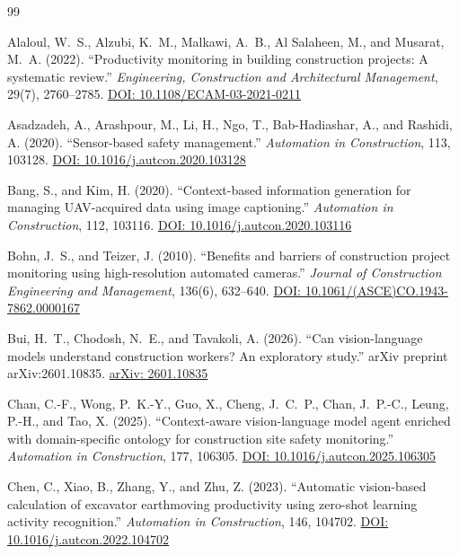 \documentclass[10pt,letterpaper]{article}
\begin{document}
\begin{thebibliography}{99}

 Alaloul, W.~S., Alzubi, K.~M., Malkawi, A.~B., Al Salaheen, M., and Musarat, M.~A. (2022). ``Productivity monitoring in building construction projects: A systematic review.'' \textit{Engineering, Construction and Architectural Management}, 29(7), 2760--2785. \href{https://doi.org/10.1108/ECAM-03-2021-0211}{DOI: 10.1108/ECAM-03-2021-0211}

 Asadzadeh, A., Arashpour, M., Li, H., Ngo, T., Bab-Hadiashar, A., and Rashidi, A. (2020). ``Sensor-based safety management.'' \textit{Automation in Construction}, 113, 103128. \href{https://doi.org/10.1016/j.autcon.2020.103128}{DOI: 10.1016/j.autcon.2020.103128}

 Bang, S., and Kim, H. (2020). ``Context-based information generation for managing UAV-acquired data using image captioning.'' \textit{Automation in Construction}, 112, 103116. \href{https://doi.org/10.1016/j.autcon.2020.103116}{DOI: 10.1016/j.autcon.2020.103116}

 Bohn, J.~S., and Teizer, J. (2010). ``Benefits and barriers of construction project monitoring using high-resolution automated cameras.'' \textit{Journal of Construction Engineering and Management}, 136(6), 632--640. \href{https://doi.org/10.1061/(ASCE)CO.1943-7862.0000167}{DOI: 10.1061/(ASCE)CO.1943-7862.0000167}

 Bui, H.~T., Chodosh, N.~E., and Tavakoli, A. (2026). ``Can vision-language models understand construction workers? An exploratory study.'' arXiv preprint arXiv:2601.10835. \href{https://arxiv.org/abs/2601.10835}{arXiv: 2601.10835}

 Chan, C.-F., Wong, P.~K.-Y., Guo, X., Cheng, J.~C.~P., Chan, J.~P.-C., Leung, P.-H., and Tao, X. (2025). ``Context-aware vision-language model agent enriched with domain-specific ontology for construction site safety monitoring.'' \textit{Automation in Construction}, 177, 106305. \href{https://doi.org/10.1016/j.autcon.2025.106305}{DOI: 10.1016/j.autcon.2025.106305}

 Chen, C., Xiao, B., Zhang, Y., and Zhu, Z. (2023). ``Automatic vision-based calculation of excavator earthmoving productivity using zero-shot learning activity recognition.'' \textit{Automation in Construction}, 146, 104702. \href{https://doi.org/10.1016/j.autcon.2022.104702}{DOI: 10.1016/j.autcon.2022.104702}


\end{thebibliography}
\end{document}
